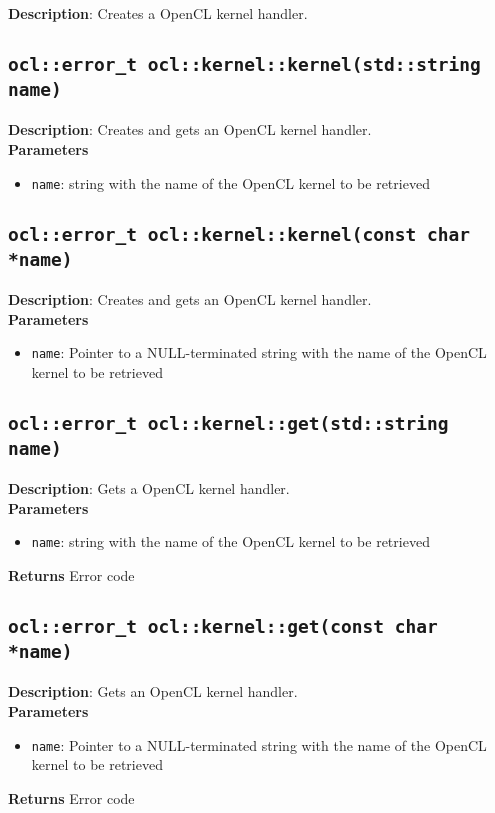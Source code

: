 \textbf{Description}: Creates a OpenCL kernel handler.

\subsection{\texttt{ocl::error\_t ocl::kernel::kernel(std::string name)}}

\textbf{Description}: Creates and gets an OpenCL kernel handler. \\
\textbf{Parameters}
\begin{itemize}
  \item \texttt{name}: string with the name of the OpenCL kernel to be retrieved
\end{itemize}

\subsection{\texttt{ocl::error\_t ocl::kernel::kernel(const char *name)}}

\textbf{Description}: Creates and gets an OpenCL kernel handler. \\
\textbf{Parameters}
\begin{itemize}
  \item \texttt{name}: Pointer to a NULL\hyp{}terminated string with the name of the OpenCL kernel 
to be retrieved
\end{itemize}

\subsection{\texttt{ocl::error\_t ocl::kernel::get(std::string name)}}

\textbf{Description}: Gets a OpenCL kernel handler. \\
\textbf{Parameters}
\begin{itemize}
  \item \texttt{name}: string with the name of the OpenCL kernel to be retrieved
\end{itemize}
\textbf{Returns} Error code

\subsection{\texttt{ocl::error\_t ocl::kernel::get(const char *name)}}

\textbf{Description}: Gets an OpenCL kernel handler. \\
\textbf{Parameters}
\begin{itemize}
  \item \texttt{name}: Pointer to a NULL\hyp{}terminated string with the name of the OpenCL kernel 
to be retrieved
\end{itemize}
\textbf{Returns} Error code

